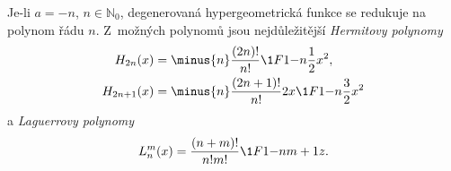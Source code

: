 Je-li $a=-n$, $n\in\mathbb{N}_{0}$, degenerovaná hypergeometrická funkce se redukuje na polynom řádu $n$.
Z~možných polynomů jsou nejdůležitější \emph{Hermitovy polynomy}
\begin{subequations}
    \begin{align}
    H_{2n}(x)
        &=\minus{n}\frac{(2n)!}{n!}\1F1{-n}{\frac{1}{2}}{x^{2}},\\
    H_{2n+1}(x)
        &=\minus{n}\frac{(2n+1)!}{n!}2x\1F1{-n}{\frac{3}{2}}{x^{2}}
    \end{align}
\end{subequations}
a \emph{Laguerrovy polynomy}
\begin{equation}
    L_{n}^{m}(x)
        =\frac{(n+m)!}{n!m!}\1F1{-n}{m+1}{z}.
\end{equation}
